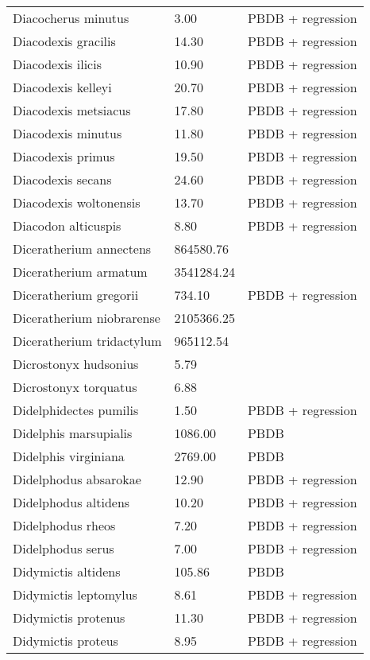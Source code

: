 \begin{longtable}{p{} p{} p{}}
    Diacocherus minutus & 3.00 & PBDB + regression \\ 
    Diacodexis gracilis & 14.30 & PBDB + regression \\ 
    Diacodexis ilicis & 10.90 & PBDB + regression \\ 
    Diacodexis kelleyi & 20.70 & PBDB + regression \\ 
    Diacodexis metsiacus & 17.80 & PBDB + regression \\ 
    Diacodexis minutus & 11.80 & PBDB + regression \\ 
    Diacodexis primus & 19.50 & PBDB + regression \\ 
    Diacodexis secans & 24.60 & PBDB + regression \\ 
    Diacodexis woltonensis & 13.70 & PBDB + regression \\ 
    Diacodon alticuspis & 8.80 & PBDB + regression \\ 
    Diceratherium annectens & 864580.76 & \cite{Tomiya2013} \\ 
    Diceratherium armatum & 3541284.24 & \cite{Tomiya2013} \\ 
    Diceratherium gregorii & 734.10 & PBDB + regression \\ 
    Diceratherium niobrarense & 2105366.25 & \cite{Tomiya2013} \\ 
    Diceratherium tridactylum & 965112.54 & \cite{Tomiya2013} \\ 
    Dicrostonyx hudsonius & 5.79 & \cite{Smith2004} \\ 
    Dicrostonyx torquatus & 6.88 & \cite{Smith2004} \\ 
    Didelphidectes pumilis & 1.50 & PBDB + regression \\ 
    Didelphis marsupialis & 1086.00 & PBDB \\ 
    Didelphis virginiana & 2769.00 & PBDB \\ 
    Didelphodus absarokae & 12.90 & PBDB + regression \\ 
    Didelphodus altidens & 10.20 & PBDB + regression \\ 
    Didelphodus rheos & 7.20 & PBDB + regression \\ 
    Didelphodus serus & 7.00 & PBDB + regression \\ 
    Didymictis altidens & 105.86 & PBDB \\ 
    Didymictis leptomylus & 8.61 & PBDB + regression \\ 
    Didymictis protenus & 11.30 & PBDB + regression \\ 
    Didymictis proteus & 8.95 & PBDB + regression \\ 

\end{longtable}
